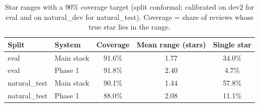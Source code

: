 \begin{table}[htbp]
\centering
\caption{Star ranges with a 90\% coverage target (split conformal; calibrated on dev2 for eval and on natural\_dev for natural\_test). Coverage = share of reviews whose true star lies in the range.}
\label{tab:e23conformal}
\small
\begin{tabular}{llccc}
\toprule
\textbf{Split} & \textbf{System} & \textbf{Coverage} & \textbf{Mean range (stars)} & \textbf{Single star} \\
\midrule
eval & Main stack & 91.6\% & 1.77 & 34.0\% \\
eval & Phase 1 & 91.8\% & 2.40 & 4.7\% \\
natural\_test & Main stack & 90.1\% & 1.44 & 57.8\% \\
natural\_test & Phase 1 & 88.0\% & 2.08 & 11.1\% \\
\bottomrule
\end{tabular}
\end{table}
